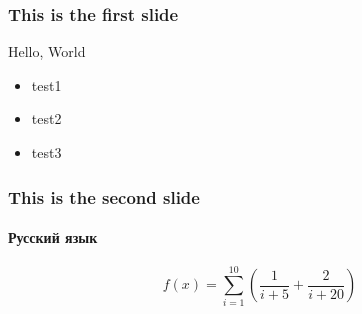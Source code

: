 \documentclass{beamer}
\begin{document}
  \begin{frame}
    \frametitle{This is the first slide}
    Hello, World
    \begin{itemize}
    \item test1
    \item test2
    \item test3
    \end{itemize}
  \end{frame}

  \begin{frame}
    \frametitle{This is the second slide}
    \framesubtitle{Русский язык}
    \begin{equation}
      f(x) = \sum_{i = 1}^{10} \left(\frac{1}{i + 5} + \frac{2}{i +
        20}\right)
    \end{equation}
  \end{frame}
\end{document}
